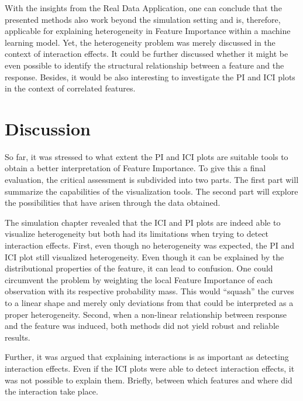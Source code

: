 \documentclass[
]{krantz}
\begin{document}
With the insights from the Real Data Application, one can conclude that the presented methods also work beyond the simulation setting and is, therefore, applicable for explaining heterogeneity in Feature Importance within a machine learning model. Yet, the heterogeneity problem was merely discussed in the context of interaction effects. It could be further discussed whether it might be even possible to identify the structural relationship between a feature and the response. Besides, it would be also interesting to investigate the PI and ICI plots in the context of correlated features.

\pagebreak

\hypertarget{ch5}{%
\section{Discussion}\label{ch5}}

So far, it was stressed to what extent the PI and ICI plots are suitable tools to obtain a better interpretation of Feature Importance. To give this a final evaluation, the critical assessment is subdivided into two parts. The first part will summarize the capabilities of the visualization tools. The second part will explore the possibilities that have arisen through the data obtained.

The simulation chapter revealed that the ICI and PI plots are indeed able to visualize heterogeneity but both had its limitations when trying to detect interaction effects. First, even though no heterogeneity was expected, the PI and ICI plot still visualized heterogeneity. Even though it can be explained by the distributional properties of the feature, it can lead to confusion. One could circumvent the problem by weighting the local Feature Importance of each observation with its respective probability mass. This would ``squash'' the curves to a linear shape and merely only deviations from that could be interpreted as a proper heterogeneity. Second, when a non-linear relationship between response and the feature was induced, both methods did not yield robust and reliable results.

Further, it was argued that explaining interactions is as important as detecting interaction effects. Even if the ICI plots were able to detect interaction effects, it was not possible to explain them. Briefly, between which features and where did the interaction take place.
\end{document}
